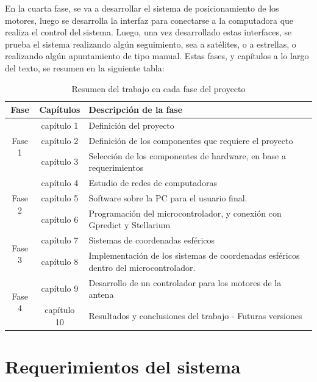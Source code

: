 En la cuarta fase, se va a desarrollar el sistema de posicionamiento de los motores, luego se desarrolla la interfaz para conectarse a la computadora que realiza el control del sistema. Luego, una vez desarrollado estas interfaces, se prueba el sistema realizando algún seguimiento, sea a satélites, o a estrellas, o realizando algún apuntamiento de tipo manual. Estas fases, y capítulos a lo largo del texto, se resumen en la siguiente tabla:    


\renewcommand{\arraystretch}{1.5}

\begin{table}[ht]
	\centering
	\begin{tabular}{|c|c|p{8cm}|}
		\hline
		Fase & Capítulos & Descripción de la fase \\
		\hline 
		\multirow{3}{2cm}{Fase 1} & capítulo 1 & {Definición del proyecto} \\ \cline{2-3}
		& capítulo 2& Definición de los componentes que requiere el proyecto\\ \cline{2-3}
		& capítulo 3& Selección de los componentes de hardware, en base a requerimientos\\ \hline 
		\multirow{3}{2cm}{Fase 2} & capítulo 4 & Estudio de redes de computadoras \\ \cline{2-3}
		& capítulo 5& Software sobre la PC para el usuario final.\\ \cline{2-3}
		& capítulo 6& Programación del microcontrolador, y conexión con Gpredict y Stellarium\\ \hline 
		

	   \multirow{2}{2cm}{Fase 3} & capítulo 7 & Sistemas de coordenadas esféricos\\ \cline{2-3}
	   & capítulo 8& Implementación de los sistemas de coordenadas esféricos dentro del microcontrolador.\\ \cline{2-3} \hline 
	   
	\multirow{2}{2cm}{Fase 4} & capítulo 9 & Desarrollo de un controlador para los motores de la antena\\ \cline{2-3}
	& capítulo 10& Resultados y conclusiones del trabajo - Futuras versiones\\ \cline{2-3} \hline 
	\end{tabular}
	\caption{Resumen del trabajo en cada fase del proyecto}
\end{table}


\section{ Requerimientos del sistema} \label{req_sist}

